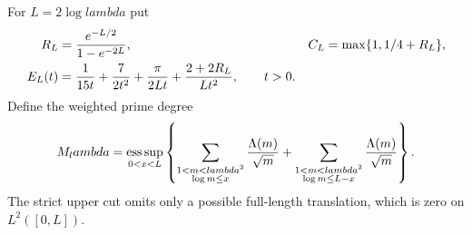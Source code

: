 \documentclass[11pt]{article}
\def\lambda{lambda}%
\theoremstyle{remark}
\begin{document}
For $L=2\log\lambda$ put
\begin{align}
 R_L&=\frac{e^{-L/2}}{1-e^{-2L}},&
 C_L&=\max\{1,1/4+R_L\},\notag\\
 E_L(t)&=\frac1{15t}+\frac7{2t^2}
       +\frac\pi{2Lt}+\frac{2+2R_L}{Lt^2},\qquad t>0.
 \label{eq:v115-arch-errors}
\end{align}
Define the weighted prime degree
\begin{equation}\label{eq:v115-prime-degree}
 M_\lambda=\mathop{\rm ess\,sup}_{0<x<L}
 \left\{\sum_{\substack{1<m<\lambda^2\\\log m\le x}}
                    \frac{\Lambda(m)}{\sqrt m}
       +\sum_{\substack{1<m<\lambda^2\\\log m\le L-x}}
                    \frac{\Lambda(m)}{\sqrt m}\right\}.
\end{equation}
The strict upper cut omits only a possible full-length translation,
which is zero on $L^2([0,L])$.
\end{document}
